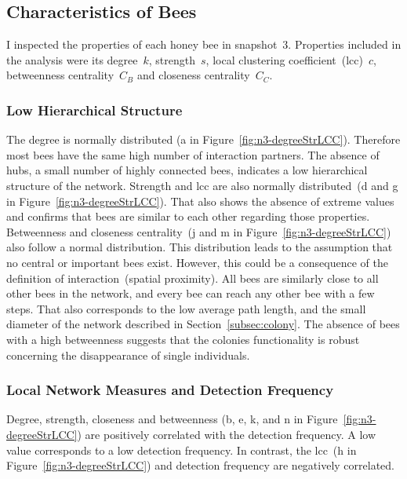 \subsection{Characteristics of Bees}
\label{subsubsec:bees}
I inspected the properties of each honey bee in snapshot~3.
Properties included in the analysis were its degree~$k$, strength~$s$, local clustering coefficient~(lcc)~$c$, betweenness centrality~$C_B$ and closeness centrality~$C_C$.

\subsubsection{Low Hierarchical Structure}
The degree is normally distributed (a in Figure~\ref{fig:n3-degreeStrLCC}).
Therefore most bees have the same high number of interaction partners.
The absence of hubs, a small number of highly connected bees, indicates a low hierarchical structure of the network.
Strength and lcc are also normally distributed~(d and g in Figure~\ref{fig:n3-degreeStrLCC}).
That also shows the absence of extreme values and confirms that bees are similar to each other regarding those properties.
Betweenness and closeness centrality~(j and m in Figure~\ref{fig:n3-degreeStrLCC}) also follow a normal distribution.
This distribution leads to the assumption that no central or important bees exist. However, this could be a consequence of the definition of interaction~(spatial proximity).
All bees are similarly close to all other bees in the network, and every bee can reach any other bee with a few steps.
That also corresponds to the low average path length, and the small diameter of the network described in Section~\ref{subsec:colony}.
The absence of bees with a high betweenness suggests that the colonies functionality is robust concerning the disappearance of single individuals.

\subsubsection{Local Network Measures and Detection Frequency}
Degree, strength, closeness and betweenness (b, e, k, and n in Figure~\ref{fig:n3-degreeStrLCC}) are positively correlated with the detection frequency. A low value corresponds to a low detection frequency. In contrast, the lcc~(h in Figure~\ref{fig:n3-degreeStrLCC}) and detection frequency are negatively correlated.

